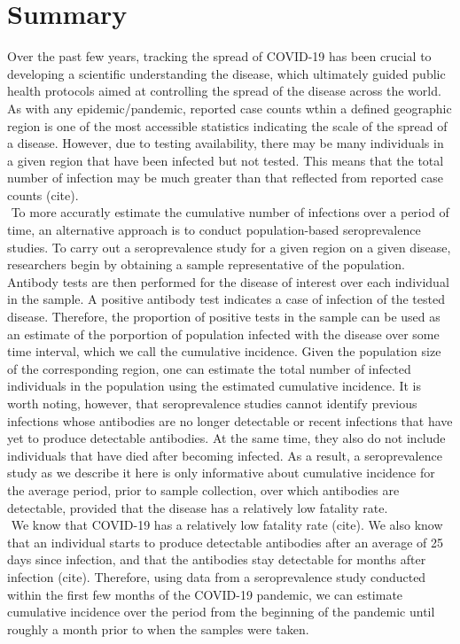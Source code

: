 \section{Summary}
Over the past few years, tracking the spread of COVID-19 has been crucial to developing a scientific understanding the disease, which ultimately guided public health protocols aimed at controlling the spread of the disease across the world. As with any epidemic/pandemic, reported case counts wthin a defined geographic region is one of the most accessible statistics indicating the scale of the spread of a disease. However, due to testing availability, there may be many individuals in a given region that have been infected but not tested. This means that the total number of infection may be much greater than that reflected from reported case counts (cite).\\
\newline$ $
To more accuratly estimate the cumulative number of infections over a period of time, an alternative approach is to conduct population-based seroprevalence studies. To carry out a seroprevalence study for a given region on a given disease, researchers begin by obtaining a sample representative of the population. Antibody tests are then performed for the disease of interest over each individual in the sample. A positive antibody test indicates a case of infection of the tested disease. Therefore, the proportion of positive tests in the sample can be used as an estimate of the porportion of population infected with the disease over some time interval, which we call the cumulative incidence. Given the population size of the corresponding region, one can estimate the total number of infected individuals in the population using the estimated cumulative incidence. It is worth noting, however, that seroprevalence studies cannot identify previous infections whose antibodies are no longer detectable or recent infections that have yet to produce detectable antibodies. At the same time, they also do not include individuals that have died after becoming infected. As a result, a seroprevalence study as we describe it here is only informative about cumulative incidence for the average period, prior to sample collection, over which antibodies are detectable, provided that the disease has a relatively low fatality rate.\\
\newline$ $
We know that COVID-19 has a relatively low fatality rate (cite). We also know that an individual starts to produce detectable antibodies after an average of 25 days since infection, and that the antibodies stay detectable for months after infection (cite). Therefore, using data from a seroprevalence study conducted within the first few months of the COVID-19 pandemic, we can estimate cumulative incidence over the period from the beginning of the pandemic until roughly a month prior to when the samples were taken.\\
